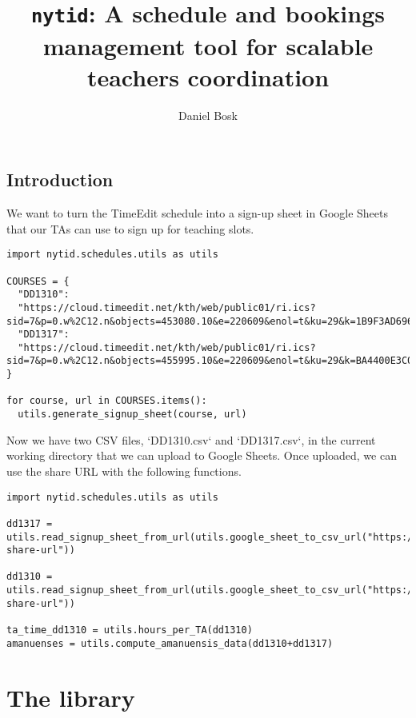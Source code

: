 \documentclass[a4paper,oneside]{book}
\title{%
  \texttt{nytid}: A schedule and bookings management tool for scalable teachers 
  coordination
}
\author{%
  Daniel Bosk
}
\affil{%
  KTH EECS\\
  \texttt{dbosk@kth.se}
}
\newenvironment{abstract}{}{}
\begin{document}
\frontmatter
\maketitle

\vspace*{\fill}
\clearpage

\begin{abstract}
  
\end{abstract}
\clearpage

\tableofcontents
\clearpage

\mainmatter
\chapter{Introduction}

We want to turn the TimeEdit schedule into a sign-up sheet in Google Sheets 
that our TAs can use to sign up for teaching slots.
\begin{verbatim}
import nytid.schedules.utils as utils

COURSES = {
  "DD1310": 
  "https://cloud.timeedit.net/kth/web/public01/ri.ics?sid=7&p=0.w%2C12.n&objects=453080.10&e=220609&enol=t&ku=29&k=1B9F3AD696BCA5C434C68950EFD376DD",
  "DD1317": 
  "https://cloud.timeedit.net/kth/web/public01/ri.ics?sid=7&p=0.w%2C12.n&objects=455995.10&e=220609&enol=t&ku=29&k=BA4400E3C003685549BC65AD9EAD3DC58E"
}

for course, url in COURSES.items():
  utils.generate_signup_sheet(course, url)
\end{verbatim}

Now we have two CSV files, `DD1310.csv` and `DD1317.csv`, in the current 
working directory that we can upload to Google Sheets. Once uploaded, we can 
use the share URL with the following functions.
\begin{verbatim}
import nytid.schedules.utils as utils

dd1317 = utils.read_signup_sheet_from_url(utils.google_sheet_to_csv_url("https://docs.google.com/spreadsheets/d/the-share-url"))

dd1310 = utils.read_signup_sheet_from_url(utils.google_sheet_to_csv_url("https://docs.google.com/spreadsheets/d/the-share-url"))

ta_time_dd1310 = utils.hours_per_TA(dd1310)
amanuenses = utils.compute_amanuensis_data(dd1310+dd1317)
\end{verbatim}


\part{The library}





%
%



\backmatter
\printbibliography
\end{document}
